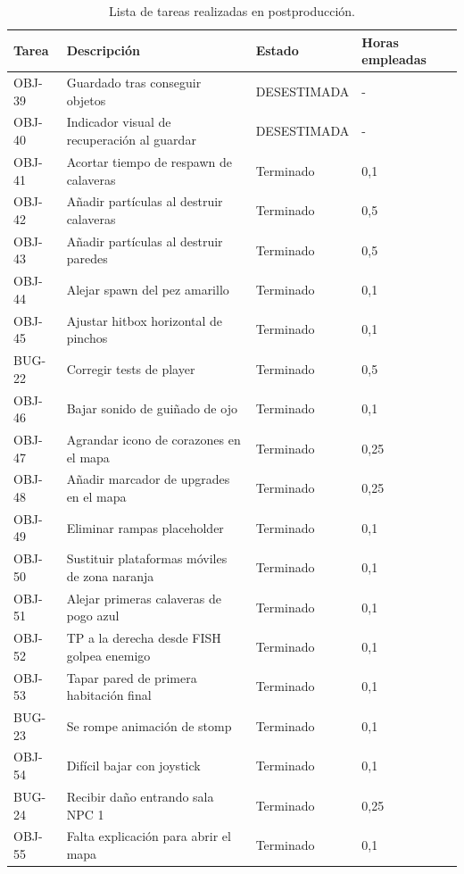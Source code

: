 \begin{table}[hbt]
    \centering
    \begin{tabular}{|l|p{6cm}|l|p{2cm}|}
    \hline
    \textbf{Tarea} & \textbf{Descripción} & \textbf{Estado} & \textbf{Horas empleadas} \\ \hline
    OBJ-39 & Guardado tras conseguir objetos & DESESTIMADA & - \\ \hline
    OBJ-40 & Indicador visual de recuperación al guardar & DESESTIMADA & - \\ \hline
    OBJ-41 & Acortar tiempo de respawn de calaveras & Terminado & 0,1 \\ \hline
    OBJ-42 & Añadir partículas al destruir calaveras & Terminado & 0,5 \\ \hline
    OBJ-43 & Añadir partículas al destruir paredes & Terminado & 0,5 \\ \hline
    OBJ-44 & Alejar spawn del pez amarillo & Terminado & 0,1 \\ \hline
    OBJ-45 & Ajustar hitbox horizontal de pinchos & Terminado & 0,1 \\ \hline
    BUG-22 & Corregir tests de player & Terminado & 0,5 \\ \hline
    OBJ-46 & Bajar sonido de guiñado de ojo & Terminado & 0,1 \\ \hline
    OBJ-47 & Agrandar icono de corazones en el mapa & Terminado & 0,25 \\ \hline
    OBJ-48 & Añadir marcador de upgrades en el mapa & Terminado & 0,25 \\ \hline
    OBJ-49 & Eliminar rampas placeholder & Terminado & 0,1 \\ \hline
    OBJ-50 & Sustituir plataformas móviles de zona naranja & Terminado & 0,1 \\ \hline
    OBJ-51 & Alejar primeras calaveras de pogo azul & Terminado & 0,1 \\ \hline
    OBJ-52 & TP a la derecha desde FISH golpea enemigo & Terminado & 0,1 \\ \hline
    OBJ-53 & Tapar pared de primera habitación final & Terminado & 0,1 \\ \hline
    BUG-23 & Se rompe animación de stomp & Terminado & 0,1 \\ \hline
    OBJ-54 & Difícil bajar con joystick & Terminado & 0,1 \\ \hline
    BUG-24 & Recibir daño entrando sala NPC 1 & Terminado & 0,25 \\ \hline
    OBJ-55 & Falta explicación para abrir el mapa & Terminado & 0,1 \\ \hline
    \end{tabular}
    \caption{Lista de tareas realizadas en postproducción.}
    \label{tab:postpro3}
\end{table}


